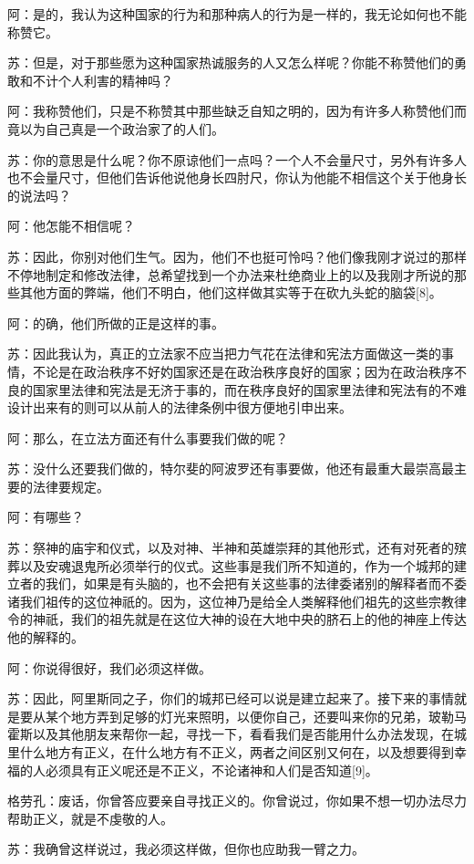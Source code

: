 \documentclass[12pt,oneside]{book}
\begin{document}
阿：是的，我认为这种国家的行为和那种病人的行为是一样的，我无论如何也不能称赞它。

苏：但是，对于那些愿为这种国家热诚服务的人又怎么样呢？你能不称赞他们的勇敢和不计个人利害的精神吗？

阿：我称赞他们，只是不称赞其中那些缺乏自知之明的，因为有许多人称赞他们而竟以为自己真是一个政治家了的人们。

苏：你的意思是什么呢？你不原谅他们一点吗？一个人不会量尺寸，另外有许多人也不会量尺寸，但他们告诉他说他身长四肘尺，你认为他能不相信这个关于他身长的说法吗？

阿：他怎能不相信呢？

苏：因此，你别对他们生气。因为，他们不也挺可怜吗？他们像我刚才说过的那样不停地制定和修改法律，总希望找到一个办法来杜绝商业上的以及我刚才所说的那些其他方面的弊端，他们不明白，他们这样做其实等于在砍九头蛇的脑袋[8]。

阿：的确，他们所做的正是这样的事。

苏：因此我认为，真正的立法家不应当把力气花在法律和宪法方面做这一类的事情，不论是在政治秩序不好妁国家还是在政治秩序良好的国家；因为在政治秩序不良的国家里法律和宪法是无济于事的，而在秩序良好的国家里法律和宪法有的不难设计出来有的则可以从前人的法律条例中很方便地引申出来。

阿：那么，在立法方面还有什么事要我们做的呢？

苏：没什么还要我们做的，特尔斐的阿波罗还有事要做，他还有最重大最崇高最主要的法律要规定。

阿：有哪些？

苏：祭神的庙宇和仪式，以及对神、半神和英雄崇拜的其他形式，还有对死者的殡葬以及安魂退鬼所必须举行的仪式。这些事是我们所不知道的，作为一个城邦的建立者的我们，如果是有头脑的，也不会把有关这些事的法律委诸别的解释者而不委诸我们祖传的这位神祇的。因为，这位神乃是给全人类解释他们祖先的这些宗教律令的神祇，我们的祖先就是在这位大神的设在大地中央的脐石上的他的神座上传达他的解释的。

阿：你说得很好，我们必须这样做。

苏：因此，阿里斯同之子，你们的城邦已经可以说是建立起来了。接下来的事情就是要从某个地方弄到足够的灯光来照明，以便你自己，还要叫来你的兄弟，玻勒马霍斯以及其他朋友来帮你一起，寻找一下，看看我们是否能用什么办法发现，在城里什么地方有正义，在什么地方有不正义，两者之间区别又何在，以及想要得到幸福的人必须具有正义呢还是不正义，不论诸神和人们是否知道[9]。

格劳孔：废话，你曾答应要亲自寻找正义的。你曾说过，你如果不想一切办法尽力帮助正义，就是不虔敬的人。

苏：我确曾这样说过，我必须这样做，但你也应助我一臂之力。
\end{document}
